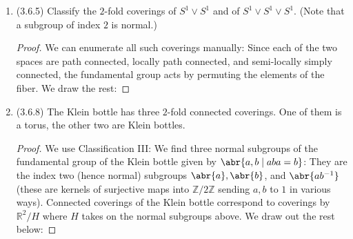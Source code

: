 \documentclass[11pt]{article}
\begin{document}
\begin{enumerate}
\begin{proof}
      Conversely, take an element of $\mathrm{GL}_n(\mathbb{Z})$ and view it as a linear operator $F$ on $\mathbb{R}^n$. Then with $q$ surjective we set $f = qFq_r^{-1}$, where $q_r^{-1}$ is the right inverse of $q$. We show that $f$ is an automorphism of $T^n$ with inverse $qF^{-1}q_r^{-1}$ This does not work and I am not sure how to produce the right automorphism of $T^n$ from $F$.
    \end{proof}
    \item (3.6.5) Classify the $2$-fold coverings of $S^1\vee S^1$ and of $S^1\vee S^1 \vee S^1$. (Note that a subgroup of index $2$ is normal.) \begin{proof}
      We can enumerate all such coverings manually: Since each of the two spaces are path connected, locally path connected, and semi-locally simply connected, the fundamental group acts by permuting the elements of the fiber. We draw the rest: \vspace*{6cm}
    \end{proof}
    \item (3.6.8) The Klein bottle has three $2$-fold connected coverings. One of them is a torus, the other two are Klein bottles.
    \begin{proof}
      We use Classification III: We find three normal subgroups of the fundamental group of the Klein bottle given by $\abr{a,b\mid aba=b}$: They are the index two (hence normal) subgroups $\abr{a},\abr{b}$, and $\abr{ab^{-1}}$ (these are kernels of surjective maps into $\mathbb{Z}/2\mathbb{Z}$ sending $a,b$ to $1$ in various ways). Connected coverings of the Klein bottle correspond to coverings by $\mathbb{R}^2/H$ where $H$ takes on the normal subgroups above. We draw out the rest below:
    \end{proof}
\end{enumerate}
\end{document}
